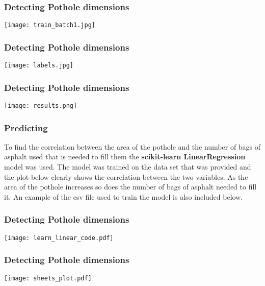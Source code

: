 \documentclass{beamer}
\begin{document}
\begin{frame}
\frametitle{Detecting Pothole dimensions}
\begin{center}
\texttt{[image: train\_batch1.jpg]}
\end{center}
\end{frame}

\begin{frame}
\frametitle{Detecting Pothole dimensions}
\begin{center}
\texttt{[image: labels.jpg]}
\end{center}
\end{frame}

\begin{frame}
\frametitle{Detecting Pothole dimensions}
\begin{center}
\texttt{[image: results.png]}
\end{center}
\end{frame}

\begin{frame}
\frametitle{Predicting}
To find the correlation between the area of the pothole and the number of bags of asphalt used that is needed to fill them the \textbf{scikit-learn LinearRegression} model was used. The model was trained on the data set that was provided and the plot below clearly shows the correlation between the two variables. As the area of the pothole increases so does the number of bags of asphalt needed to fill it. An example of the csv file used to train the model is also included below.
\end{frame}

\begin{frame}
\frametitle{Detecting Pothole dimensions}
\begin{center}
\texttt{[image: learn\_linear\_code.pdf]}
\end{center}
\end{frame}

\begin{frame}
\frametitle{Detecting Pothole dimensions}
\begin{center}
\texttt{[image: sheets\_plot.pdf]}
\end{center}
\end{frame}
\end{document}
